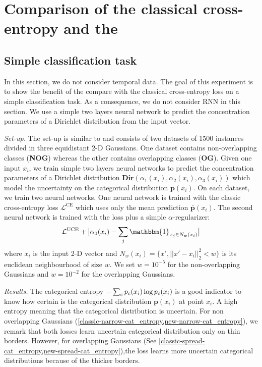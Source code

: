 \section{Comparison of the classical cross-entropy and the \UncertaintyLoss}
\label{uncertain_loss_classification}

\subsection{Simple classification task}

In this section, we do not consider temporal data. The goal of this experiment is to show the benefit of the \UncertaintyLoss compare with the classical cross-entropy loss on a simple classification task. As a consequence, we do not consider RNN in this section. We use a simple two layers neural network to predict the concentration parameters of a Dirichlet distribution from the input vector.

\textit{Set-up.} The set-up is similar to \cite{PriorNetworks} and consists of two datasets of 1500 instances divided in three equidistant 2-D Gaussians. One dataset contains non-overlapping classes (\textbf{NOG}) whereas the other contains overlapping classes (\textbf{OG}). Given one input $x_i$, we train simple two layers neural networks to predict the concentration parameters of a Dirichlet distribution $\textbf{Dir}(\alpha_1(x_i), \alpha_2(x_i), \alpha_3(x_i))$ which model the uncertainty on the categorical distribution $\bm{p}(x_i)$. On each dataset, we train two neural networks. One neural network is trained with the classic cross-entropy loss $\mathcal{L}^{\text{CE}}$ which uses only the mean prediction $\bar{\bm{p}}(x_i)$. The second neural network is trained with the \UncertaintyLoss loss plus a simple $\alpha$-regularizer:
\begin{equation}
\begin{aligned}
\mathcal{L}^{\text{UCE}} + \bigl\lvert\alpha_0(x_i) - \sum_j  \mathbbm{1}_{x_j \in N_w(x_i) }\bigr\rvert
\end{aligned}
\end{equation}
where $x_i$ is the input 2-D vector and $N_w(x_i) = \{x', ||x' - x_i||_2^2 < w\}$ is its euclidean neighbourhood of size $w$. We set $w=10^{-5}$ for the non-overlapping Gaussians and $w=10^{-2}$ for the overlapping Gaussians.

\textit{Results.} The categorical entropy $-\sum_c p_c(x_i) \log p_c(x_i)$ is a good indicator to know how certain is the categorical distribution $\bm{p}(x_i)$ at point $x_i$. A high entropy meaning that the categorical distribution is uncertain. For non overlapping Gaussians (\cref{classic-narrow-cat_entropy,new-narrow-cat_entropy}), we remark that both losses learn uncertain categorical distribution only on thin borders. However, for overlapping Gaussians (See \cref{classic-spread-cat_entropy,new-spread-cat_entropy}),the \UncertaintyLoss loss learns more uncertain categorical distributions because of the thicker borders.

